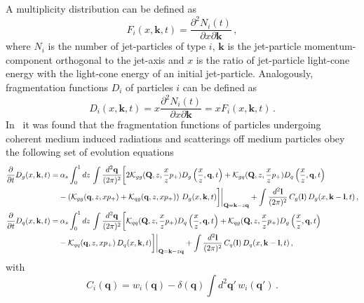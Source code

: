 \documentclass[preprint,12pt]{elsarticle}
\begin{document}
A multiplicity distribution can be defined as
%
\begin{equation}
    F_i(x, \mathbf{k},t)=\frac{\partial^2 N_i (t)}{\partial x \partial \mathbf{k}}\,,
\end{equation}
where $N_i$ is the number of jet-particles of type $i$, $\mathbf{k}$ is the jet-particle momentum-component orthogonal to the jet-axis and $x$ is the ratio of jet-particle light-cone energy with the light-cone energy of an initial jet-particle.
Analogously, fragmentation functions $D_i$ of particles $i$ can be defined as
%
\begin{equation}
    D_i(x,\mathbf{k},t)=x\frac{\partial^2 N_i (t)}{\partial x \partial \mathbf{k}}=xF_i(x,\mathbf{k},t)\,.
    \label{eq:frag_def}
\end{equation}
%
In~\cite{Blaizot:2012fh,Blaizot:2013vha,Blanco:2021usa} it was found that the fragmentation functions of particles undergoing coherent medium induced radiations and scatterings off medium particles obey the following set of evolution equations
%
\begin{align}
\frac{\partial}{\partial t} D_g(x,\mathbf{k},t) = & \:  \alpha_s \int_0^1 dz\, \int\frac{d^2\mathbf{q}}{(2\pi)^2}\bigg[2{\cal K}_{gg}(\mathbf{Q},z,\frac{x}{z}p_+) D_g\left(\frac{x}{z},\mathbf{q},t\right) + {\cal K}_{gq}(\mathbf{Q},z,\frac{x}{z}p_+) D_{q}\left(\frac{x}{z},\mathbf{q},t\right) \nonumber\\&
-  \left({\cal K}_{gg}(\mathbf{q},z,xp_+)+{\cal K}_{qg}(\mathbf{q},z,xp_+)\right)\, D_g(x,\mathbf{k},t) \bigg] \bigg|_{\mathbf{Q}=\mathbf{k}-z\mathbf{q} }
+ \int \frac{d^2\mathbf{l}}{(2\pi)^2} \,C_g(\mathbf{l})\, D_g(x,\mathbf{k}-\mathbf{l},t)\,,\label{eq:BDIM_g}\\
%
\frac{\partial}{\partial t} D_{q}(x,\mathbf{k},t) = & \:  \alpha_s \int_0^1 dz\, \int\frac{d^2\mathbf{q}}{(2\pi)^2}\bigg[{\cal K}_{qq}(\mathbf{Q},z,\frac{x}{z}p_+) D_{q}\left(\frac{x}{z},\mathbf{q},t\right) +  {\cal K}_{qg}(\mathbf{Q},z,\frac{x}{z}p_+) D_g\left(\frac{x}{z},\mathbf{q},t\right) \nonumber\\&
-  {\cal K}_{qq}(\mathbf{q},z,xp_+)\, D_{q}(x,\mathbf{k},t) \bigg] \bigg|_{\mathbf{Q}=\mathbf{k}-z\mathbf{q} }
+ \int \frac{d^2\mathbf{l}}{(2\pi)^2} \,C_q(\mathbf{l})\, D_{q}(x,\mathbf{k}-\mathbf{l},t)\,,
\label{eq:BDIM_q}
\end{align}
%
with 
\begin{equation}
C_i(\mathbf{q}) = w_i(\mathbf{q}) - \delta(\mathbf{q}) \int d^2\mathbf{q'}\,w_i(\mathbf{q'})\,.
\label{eq:Cq}
\end{equation}
\end{document}
